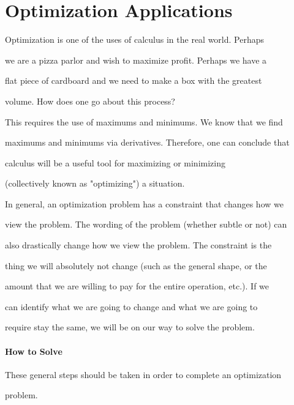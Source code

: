\section{Optimization Applications}
\label{sec:optimization-applications}

Optimization is one of the uses of calculus in the real world. Perhaps

we are a pizza parlor and wish to maximize profit. Perhaps we have a

flat piece of cardboard and we need to make a box with the greatest

volume. How does one go about this process?



This requires the use of maximums and minimums. We know that we find

maximums and minimums via derivatives. Therefore, one can conclude that

calculus will be a useful tool for maximizing or minimizing

(collectively known as "optimizing") a situation.



In general, an optimization problem has a constraint that changes how we

view the problem. The wording of the problem (whether subtle or not) can

also drastically change how we view the problem. The constraint is the

thing we will absolutely not change (such as the general shape, or the

amount that we are willing to pay for the entire operation, etc.). If we

can identify what we are going to change and what we are going to

require stay the same, we will be on our way to solve the problem.



\paragraph{How to Solve}



These general steps should be taken in order to complete an optimization

problem.



